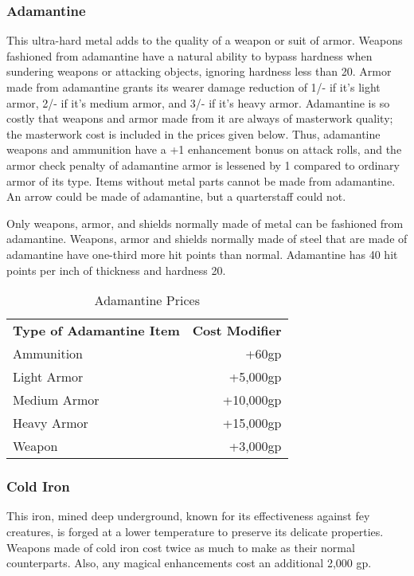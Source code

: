 \subsubsection{Adamantine}

This ultra-hard metal adds to the quality of a weapon or suit 
of armor. Weapons fashioned from adamantine have a natural ability to bypass hardness 
when sundering weapons or attacking objects, ignoring hardness less than 20. Armor 
made from adamantine grants its wearer damage reduction of 1/- if it's light armor, 
2/- if it's medium armor, and 3/- if it's heavy armor. Adamantine is so costly 
that weapons and armor made from it are always of masterwork quality; the masterwork 
cost is included in the prices given below. Thus, adamantine weapons and ammunition 
have a +1 enhancement bonus on attack rolls, and the armor check penalty of adamantine 
armor is lessened by 1 compared to ordinary armor of its type. Items without metal 
parts cannot be made from adamantine. An arrow could be made of adamantine, but 
a quarterstaff could not.

Only weapons, armor, and shields normally made of metal can be fashioned from adamantine. 
Weapons, armor and shields normally made of steel that are made of adamantine have 
one-third more hit points than normal. Adamantine has 40 hit points per inch of 
thickness and hardness 20.

\begin{table}[htb]
\caption{Adamantine Prices}
\centering
\begin{tabular}{l r}
\textbf{Type of Adamantine Item} & \textbf{Cost Modifier}\\
Ammunition & +60gp\\
Light Armor & +5,000gp\\
Medium Armor & +10,000gp\\
Heavy Armor & +15,000gp\\
Weapon & +3,000gp\\
\end{tabular}
\end{table}

\subsubsection{Cold Iron}

This iron, mined deep underground, known for its effectiveness 
against fey creatures, is forged at a lower temperature to preserve its delicate 
properties. Weapons made of cold iron cost twice as much to make as their normal 
counterparts. Also, any magical enhancements cost an additional 2,000 gp. 

